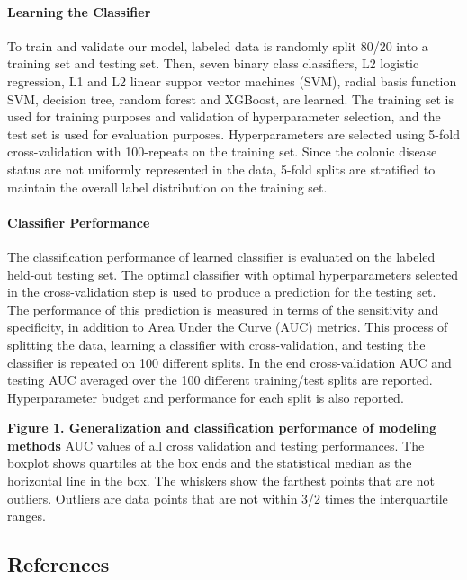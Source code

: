 \documentclass[11pt,]{article}
\let\oldparagraph\paragraph
\renewcommand{\paragraph}[1]{\oldparagraph{#1}\mbox{}}
\begin{document}
\paragraph{Learning the Classifier}\label{learning-the-classifier}

To train and validate our model, labeled data is randomly split 80/20
into a training set and testing set. Then, seven binary class
classifiers, L2 logistic regression, L1 and L2 linear suppor vector
machines (SVM), radial basis function SVM, decision tree, random forest
and XGBoost, are learned. The training set is used for training purposes
and validation of hyperparameter selection, and the test set is used for
evaluation purposes. Hyperparameters are selected using 5-fold
cross-validation with 100-repeats on the training set. Since the colonic
disease status are not uniformly represented in the data, 5-fold splits
are stratified to maintain the overall label distribution on the
training set.

\paragraph{Classifier Performance}\label{classifier-performance}

The classification performance of learned classifier is evaluated on the
labeled held-out testing set. The optimal classifier with optimal
hyperparameters selected in the cross-validation step is used to produce
a prediction for the testing set. The performance of this prediction is
measured in terms of the sensitivity and specificity, in addition to
Area Under the Curve (AUC) metrics. This process of splitting the data,
learning a classifier with cross-validation, and testing the classifier
is repeated on 100 different splits. In the end cross-validation AUC and
testing AUC averaged over the 100 different training/test splits are
reported. Hyperparameter budget and performance for each split is also
reported.

\newpage

\textbf{Figure 1. Generalization and classification performance of
modeling methods } AUC values of all cross validation and testing
performances. The boxplot shows quartiles at the box ends and the
statistical median as the horizontal line in the box. The whiskers show
the farthest points that are not outliers. Outliers are data points that
are not within 3/2 times the interquartile ranges.

\newpage

\subsection{References}\label{references}
\end{document}
